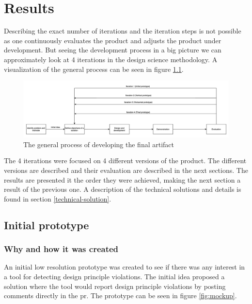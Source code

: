 \documentclass{report}
\begin{document}
\chapter{Results}
\label{results}
Describing the exact number of iterations and the iteration steps is not possible as one continuously evaluates the product and adjusts the product under development. But seeing the development process in a big picture we can approximately look at 4 iterations in the design science methodology. A visualization of the general process can be seen in figure \ref{fig:workflow}.

\begin{figure}[h!]
    \centering
    \includegraphics[width=\linewidth]{../images/workflow.png}
    \caption{The general process of developing the final artifact}
    \label{fig:workflow}
\end{figure}

The 4 iterations were focused on 4 different versions of the product. The different versions are described and their evaluation are described in the next sections. The results are presented it the order they were achieved, making the next section a result of the previous one. A description of the technical solutions and details is found in section \ref{technical-solution}.

\section{Initial prototype}
\subsection*{Why and how it was created}
An initial low resolution prototype was created to see if there was any interest in a tool for detecting design principle violations. The initial idea proposed a solution where the tool would report design principle violations by posting comments directly in the \gls{pr}. The prototype can be seen in figure \ref{fig:mockup}.
\end{document}

